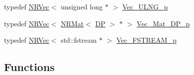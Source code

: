 \begin{DoxyCompactItemize}
typedef \mbox{\hyperlink{classNR_1_1NRVec}{N\+R\+Vec}}$<$ unsigned long $\ast$ $>$ \mbox{\hyperlink{namespaceNR_a4441bfbfcee00b3bdb45e5da10532ebe}{Vec\+\_\+\+U\+L\+N\+G\+\_\+p}}
\item 
typedef \mbox{\hyperlink{classNR_1_1NRVec}{N\+R\+Vec}}$<$ \mbox{\hyperlink{classNR_1_1NRMat}{N\+R\+Mat}}$<$ \mbox{\hyperlink{namespaceNR_af6ff762dd605ff477b8e52387253a02a}{DP}} $>$ $\ast$ $>$ \mbox{\hyperlink{namespaceNR_a13068a6bad16c3da37efbb289aae5b97}{Vec\+\_\+\+Mat\+\_\+\+D\+P\+\_\+p}}
\item 
typedef \mbox{\hyperlink{classNR_1_1NRVec}{N\+R\+Vec}}$<$ std\+::fstream $\ast$ $>$ \mbox{\hyperlink{namespaceNR_ace6a74f7f9700e1416d49842d8ac29ea}{Vec\+\_\+\+F\+S\+T\+R\+E\+A\+M\+\_\+p}}
\end{DoxyCompactItemize}
\subsection*{Functions}
